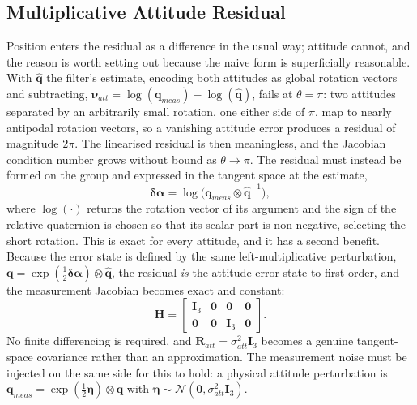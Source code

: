 \subsection{Multiplicative Attitude Residual}
\label{sec:mekf_residual}

Position enters the residual as a difference in the usual way; attitude
cannot, and the reason is worth setting out because the naive form is
superficially reasonable. With $\hat{\mathbf{q}}$ the filter's estimate,
encoding both attitudes as global rotation vectors and subtracting,
$\boldsymbol{\nu}_{att} = \log(\mathbf{q}_{meas}) - \log(\hat{\mathbf{q}})$,
fails at $\theta = \pi$: two attitudes separated by an arbitrarily small
rotation, one either side of $\pi$, map to nearly antipodal rotation vectors,
so a vanishing attitude error produces a residual of magnitude $2\pi$. The
linearised residual is then meaningless, and the Jacobian condition number
grows without bound as $\theta \to \pi$. The residual must instead be formed
on the group and expressed in the tangent space at the estimate,
\begin{equation}
\boldsymbol{\delta\alpha}
  = \log\!\bigl( \mathbf{q}_{meas} \otimes \hat{\mathbf{q}}^{-1} \bigr) ,
\label{eq:att_residual}
\end{equation}
where $\log(\cdot)$ returns the rotation vector of its argument and the sign of
the relative quaternion is chosen so that its scalar part is non-negative,
selecting the short rotation. This is exact for every attitude, and it has a
second benefit. Because the error state is defined by the same
left-multiplicative perturbation,
$\mathbf{q} = \exp(\tfrac{1}{2}\boldsymbol{\delta\alpha}) \otimes
\hat{\mathbf{q}}$, the residual \emph{is} the attitude error state to first
order, and the measurement Jacobian becomes exact and constant:
\begin{equation}
\mathbf{H} =
\begin{bmatrix}
\mathbf{I}_3 & \mathbf{0} & \mathbf{0} & \mathbf{0} \\
\mathbf{0} & \mathbf{0} & \mathbf{I}_3 & \mathbf{0}
\end{bmatrix} .
\label{eq:H_exact}
\end{equation}
No finite differencing is required, and $\mathbf{R}_{att} = \sigma_{att}^2
\mathbf{I}_3$ becomes a genuine tangent-space covariance rather than an
approximation. The measurement noise must be injected on the same side for
this to hold: a physical attitude perturbation is
$\mathbf{q}_{meas} = \exp(\tfrac{1}{2}\boldsymbol{\eta}) \otimes \mathbf{q}$
with $\boldsymbol{\eta} \sim \mathcal{N}(\mathbf{0},
\sigma_{att}^2\mathbf{I}_3)$.

